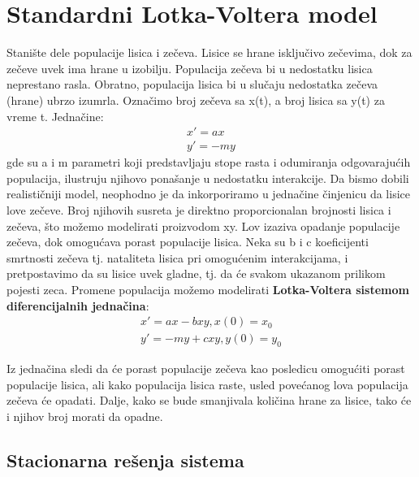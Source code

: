 \documentclass[a4paper]{article}
\begin{document}
\section{Standardni Lotka-Voltera model}
\label{sec:std_model}
Stanište dele populacije lisica i zečeva. Lisice se hrane isključivo zečevima,
dok za zečeve uvek ima hrane u izobilju. Populacija zečeva bi u nedostatku lisica
neprestano rasla. Obratno, populacija lisica bi u slučaju nedostatka zečeva (hrane) ubrzo izumrla.
Označimo broj zečeva sa x(t), a broj lisica sa y(t) za vreme t.
Jednačine:
    \begin{equation}
        \begin{aligned}
	    x' = ax \\
        y' = -my
        \end{aligned}
	\end{equation}
gde su a i m parametri koji predstavljaju stope rasta i odumiranja odgovarajućih populacija,
ilustruju njihovo ponašanje u nedostatku interakcije.
Da bismo dobili realističniji model, neophodno je da inkorporiramo u jednačine
činjenicu da lisice love zečeve. Broj njihovih susreta je direktno proporcionalan
brojnosti lisica i zečeva, što možemo modelirati proizvodom xy. Lov izaziva opadanje
populacije zečeva, dok omogućava porast populacije lisica.
Neka su b i c koeficijenti smrtnosti zečeva tj.
nataliteta lisica pri omogućenim interakcijama, i pretpostavimo da su lisice uvek gladne,
tj. da će svakom ukazanom prilikom pojesti zeca.
Promene populacija možemo modelirati \textbf{Lotka-Voltera sistemom diferencijalnih jednačina}:
        \begin{equation}
        \label{eq:standard_lv}
            \begin{aligned}
                x' = ax - bxy,   x(0)=x_0\\
                y' = -my + cxy,  y(0)=y_0
            \end{aligned}
		\end{equation}

Iz jednačina sledi da će porast populacije zečeva kao posledicu omogućiti porast populacije lisica,
ali kako populacija lisica raste, usled povećanog lova populacija zečeva će opadati.
Dalje, kako se bude smanjivala količina hrane za lisice, tako će i njihov broj morati da opadne.

\subsection{Stacionarna rešenja sistema}
\end{document}
